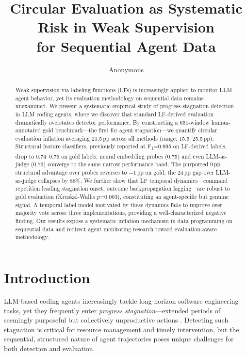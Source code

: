 \documentclass[11pt,a4paper]{article}
\title{Circular Evaluation as Systematic Risk in Weak Supervision\\for Sequential Agent Data}
\author{Anonymous}
\newcommand{\fone}{F\textsubscript{1}}
\newcommand{\pp}{\,pp}
\begin{document}
\maketitle

\begin{abstract}
Weak supervision via labeling functions (LFs) is increasingly applied to monitor LLM agent behavior, yet its evaluation methodology on sequential data remains unexamined.
We present a systematic empirical study of progress stagnation detection in LLM coding agents, where we discover that standard LF-derived evaluation dramatically overstates detector performance.
By constructing a 650-window human-annotated gold benchmark---the first for agent stagnation---we quantify circular evaluation inflation averaging 21.5\pp{} across all methods (range: 15.5--25.5\pp).
Structural feature classifiers, previously reported at \fone{}=0.995 on LF-derived labels, drop to 0.74--0.76 on gold labels; neural embedding probes (0.75) and even LLM-as-judge (0.73) converge to the same narrow performance band.
The purported 9\pp{} structural advantage over probes reverses to $-$1\pp{} on gold; the 24\pp{} gap over LLM-as-judge collapses by 88\%.
We further show that LF temporal dynamics---command repetition leading stagnation onset, outcome backpropagation lagging---are robust to gold evaluation (Kruskal-Wallis $p$=0.003), constituting an agent-specific but genuine signal.
A temporal label model motivated by these dynamics fails to improve over majority vote across three implementations, providing a well-characterized negative finding.
Our results expose a systematic inflation mechanism in data programming on sequential data and redirect agent monitoring research toward evaluation-aware methodology.
\end{abstract}

\section{Introduction}
\label{sec:intro}

LLM-based coding agents increasingly tackle long-horizon software engineering tasks, yet they frequently enter \emph{progress stagnation}---extended periods of seemingly purposeful but collectively unproductive actions \cite{devin2024,swebench2024}.
Detecting such stagnation is critical for resource management and timely intervention, but the sequential, structured nature of agent trajectories poses unique challenges for both detection and evaluation.
\end{document}
